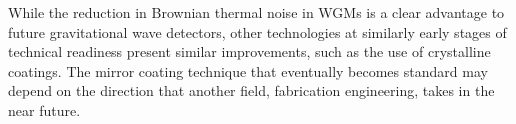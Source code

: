 While the reduction in Brownian thermal noise in \gls{WGM}s is a clear advantage to future gravitational wave detectors, other technologies at similarly early stages of technical readiness present similar improvements, such as the use of crystalline coatings. The mirror coating technique that eventually becomes standard may depend on the direction that another field, fabrication engineering, takes in the near future.